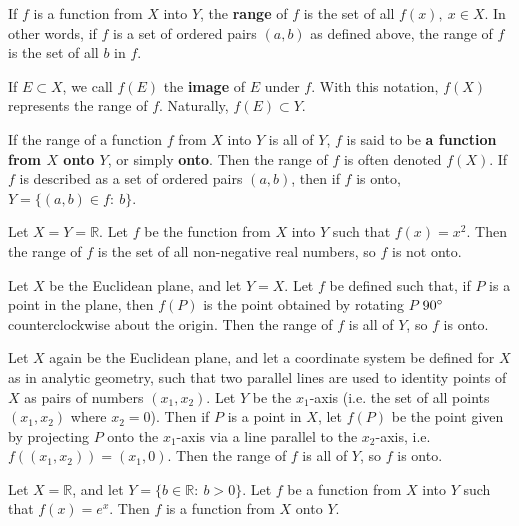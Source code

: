 \documentclass[12pt]{article}
\begin{document}
\begin{defn}
  If $f$ is a function from $X$ into $Y$, the \textbf{range} of $f$ is the set of all
  $f(x),\ x \in X$. In other words, if $f$ is a set of ordered pairs $(a,b)$ as
  defined above, the range of $f$ is the set of all $b$ in $f$.

  If $E \subset X$, we call $f(E)$ the \textbf{image} of $E$ under $f$. With this
  notation, $f(X)$ represents the range of $f$. Naturally, $f(E) \subset Y$.
\end{defn}

\begin{defn}
  If the range of a function $f$ from $X$ into $Y$ is all of $Y$, $f$ is said to be
  \textbf{a function from $X$ onto $Y$}, or simply \textbf{onto}. Then the range of
  $f$ is often denoted $f(X)$. If $f$ is described as a set of ordered pairs $(a,b)$,
  then if $f$ is onto, $Y = \{(a,b) \in f:\ b\}$.
\end{defn}

\begin{exm}
  Let $X = Y = \mathbb{R}$. Let $f$ be the function from $X$ into $Y$ such that $f(x)
  = x^2$. Then the range of $f$ is the set of all non-negative real numbers, so $f$
  is not onto.
\end{exm}

\begin{exm}
  Let $X$ be the Euclidean plane, and let $Y = X$. Let $f$ be defined such that, if
  $P$ is a point in the plane, then $f(P)$ is the point obtained by rotating $P$
  $90\degree$ counterclockwise about the origin. Then the range of $f$ is all of $Y$,
  so $f$ is onto.
\end{exm}

\begin{exm}
  Let $X$ again be the Euclidean plane, and let a coordinate system be defined for
  $X$ as in analytic geometry, such that two parallel lines are used to identity
  points of $X$ as pairs of numbers $(x_1,x_2)$. Let $Y$ be the $x_1$-axis (i.e. the
  set of all points $(x_1,x_2)$ where $x_2 = 0$). Then if $P$ is a point in $X$, let
  $f(P)$ be the point given by projecting $P$ onto the $x_1$-axis via a line parallel
  to the $x_2$-axis, i.e. $f((x_1,x_2)) = (x_1,0)$. Then the range of $f$ is all of
  $Y$, so $f$ is onto.
\end{exm}

\begin{exm}
  Let $X = \mathbb{R}$, and let $Y = \{b \in \mathbb{R}:\ b > 0\}$. Let $f$ be a
  function from $X$ into $Y$ such that $f(x) = e^x$. Then $f$ is a function from $X$
  onto $Y$.
\end{exm}
\end{document}
